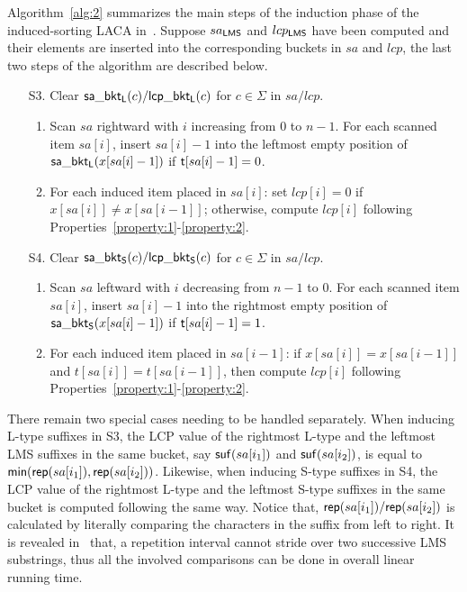 \documentclass[10pt,journal,compsoc]{IEEEtran}
\begin{document}
	Algorithm~\ref{alg:2} summarizes the main steps of the induction phase of the induced-sorting LACA in~\cite{Fischer11}. Suppose ${sa_{\sf LMS}}$ and $lcp_{\sf LMS}$ have been computed and their elements are inserted into the corresponding buckets in $sa$ and $lcp$, the last two steps of the algorithm are described below.
	
	\begin{enumerate}
		\item [S3.] Clear ${\sf sa\_bkt_L}(c)/{\sf lcp\_bkt_L}(c)$ for $c \in \Sigma$ in $sa/lcp$.
		\begin{enumerate}[(1)]
			\item
			Scan $sa$ rightward with $i$ increasing from $0$ to $n - 1$. For each scanned item $sa[i]$, insert $sa[i] - 1$ into the leftmost empty position of ${\sf sa\_bkt_L}(x[sa[i] - 1])$ if ${\sf t}[sa[i] - 1] = 0$.
			\item
			For each induced item placed in $sa[i]$: set $lcp[i] = 0$ if $x[sa[i]] \ne x[sa[i - 1]]$; otherwise, compute $lcp[i]$ following Properties~\ref{property:1}-\ref{property:2}.
		\end{enumerate}
		
		\item [S4.] Clear ${\sf sa\_bkt_S}(c)/{\sf lcp\_bkt_S}(c)$ for $c \in \Sigma$ in $sa/lcp$.
		\begin{enumerate}[(1)]
			\item
			Scan $sa$ leftward with $i$ decreasing from $n - 1$ to $0$. For each scanned item $sa[i]$, insert $sa[i] - 1$ into the rightmost empty position of ${\sf sa\_bkt_S}(x[sa[i] - 1])$ if ${\sf t}[sa[i] - 1] = 1$.
			\item
			For each induced item placed in $sa[i - 1]$: if $x[sa[i]] = x[sa[i - 1]]$ and $t[sa[i]] = t[sa[i - 1]]$, then compute $lcp[i]$ following Properties~\ref{property:1}-\ref{property:2}.
		\end{enumerate}
		
	\end{enumerate}
	
	There remain two special cases needing to be handled separately. When inducing L-type suffixes in S3, the LCP value of the rightmost L-type and the leftmost LMS suffixes in the same bucket, say ${\sf suf}(sa[i_1])$ and ${\sf suf}(sa[i_2])$, is equal to ${\sf min}({\sf rep}(sa[i_1]), {\sf rep}(sa[i_2]))$. Likewise, when inducing S-type suffixes in S4, the LCP value of the rightmost L-type and the leftmost S-type suffixes in the same bucket is computed following the same way. Notice that, ${\sf rep}(sa[i_1])/{\sf rep}(sa[i_2])$ is calculated by literally comparing the characters in the suffix from left to right. It is revealed in~\cite{Fischer11} that, a repetition interval cannot stride over two successive LMS substrings, thus all the involved comparisons can be done in overall linear running time.
	
\end{document}

